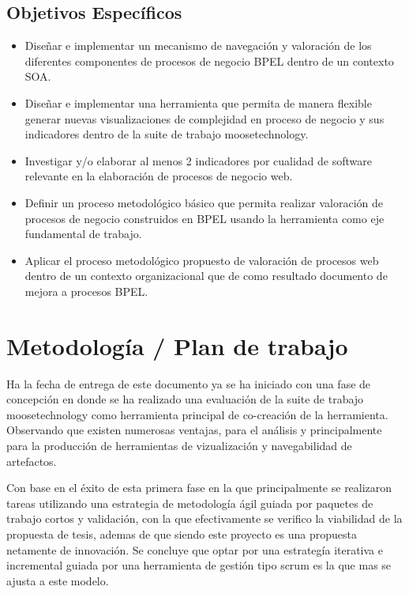 \documentclass[spanish]{article}
\begin{document}
\subsection{Objetivos Específicos}
\begin{itemize}
\item Diseñar e implementar un mecanismo de navegación y valoración de los
diferentes componentes de procesos de negocio BPEL dentro de un contexto
SOA. 
\item Diseñar e implementar una herramienta que permita de manera flexible
generar nuevas visualizaciones de complejidad en proceso de negocio
y sus indicadores dentro de la suite de trabajo moosetechnology. 
\item Investigar y/o elaborar al menos 2 indicadores por cualidad de software
relevante en la elaboración de procesos de negocio web. 
\item Definir un proceso metodológico básico que permita realizar valoración
de procesos de negocio construidos en BPEL usando la herramienta como
eje fundamental de trabajo. 
\item Aplicar el proceso metodológico propuesto de valoración de procesos
web dentro de un contexto organizacional que de como resultado documento
de mejora a procesos BPEL. 
\end{itemize}



\section{Metodología / Plan de trabajo}

Ha la fecha de entrega de este documento ya se ha iniciado con una
fase de concepción en donde se ha realizado una evaluación de la suite
de trabajo moosetechnology como herramienta principal de co-creación
de la herramienta. Observando que existen numerosas ventajas, para
el análisis y principalmente para la producción de herramientas de
vizualización y navegabilidad de artefactos.

Con base en el éxito de esta primera fase en la que principalmente
se realizaron tareas utilizando una estrategia de metodología ágil
guiada por paquetes de trabajo cortos y validación, con la que efectivamente
se verifico la viabilidad de la propuesta de tesis, ademas de que
siendo este proyecto es una propuesta netamente de innovación. Se
concluye que optar por una estrategía iterativa e incremental guiada
por una herramienta de gestión tipo scrum es la que mas se ajusta
a este modelo.
\end{document}
